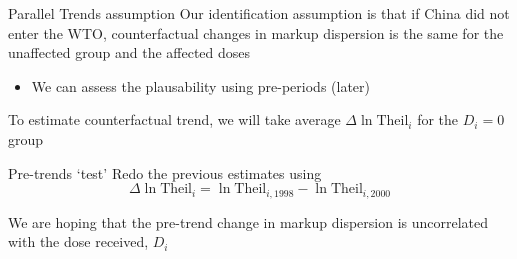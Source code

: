 \documentclass[aspectratio=43,t]{beamer}
\begin{document}

\begin{frame}{Parallel Trends assumption}
  Our identification assumption is that if China did not enter the WTO, counterfactual changes in markup dispersion is the same for the unaffected group and the affected doses

  \begin{itemize}
    \item We can assess the plausability using pre-periods (later)
  \end{itemize}

  \pause
  \bigskip\bigskip
  To estimate counterfactual trend, we will take average $\Delta \ln \text{Theil}_i$ for the $D_i = 0$ group
\end{frame}



\begin{frame}{Pre-trends `test'}
  Redo the previous estimates using
  $$
    \Delta \ln \text{Theil}_i = \ln \text{Theil}_{i, 1998} - \ln \text{Theil}_{i, 2000}
  $$

  \bigskip
  We are hoping that the pre-trend change in markup dispersion is uncorrelated with the dose received, $D_i$
\end{frame}

\end{document}
